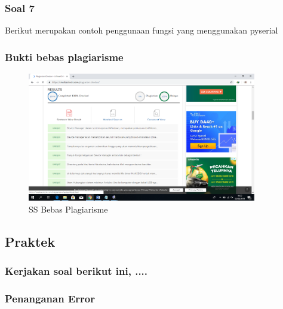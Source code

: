 \subsubsection{Soal 7}
Berikut merupakan contoh penggunaan fungsi yang menggunakan pyserial


\subsubsection{Bukti bebas plagiarisme}
\begin{figure}[H]
\centering
\includegraphics[width=10cm]{figures/5/1174009/plagi.png}
\caption{SS Bebas Plagiarisme}
\label{dwiyul}
\end{figure}

\subsection{Praktek}
\subsubsection{Kerjakan soal berikut ini, ....}
\subsubsection{Penanganan Error}